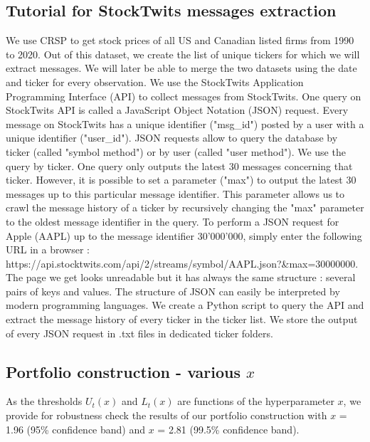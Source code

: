 \subsection{Tutorial for StockTwits messages extraction}
We use CRSP to get stock prices of all US and Canadian listed firms from 1990 to 2020. Out of this dataset, we create the list of unique tickers for which we will extract messages. We will later be able to merge the two datasets using the date and ticker for every observation. We use the StockTwits Application Programming Interface (API) to collect messages from StockTwits. One query on StockTwits API is called a JavaScript Object Notation (JSON) request. Every message on StockTwits has a unique identifier ("msg\_id") posted by a user with a unique identifier ("user\_id"). JSON requests allow to query the database by ticker (called "symbol method") or by user (called "user method"). We use the query by ticker. One query only outputs the latest 30 messages concerning that ticker. However, it is possible to set a parameter ("max") to output the latest 30 messages up to this particular message identifier. This parameter allows us to crawl the message history of a ticker by recursively changing the "max" parameter to the oldest message identifier in the query. To perform a JSON request for Apple (AAPL) up to the message identifier 30'000'000, simply enter the following URL in a browser : https://api.stocktwits.com/api/2/streams/symbol/AAPL.json?\&max=30000000. The page we get looks unreadable but it has always the same structure : several pairs of keys and values. The structure of JSON can easily be interpreted by modern programming languages. We create a Python script to query the API and extract the message history of every ticker in the ticker list. We store the output of every JSON request in .txt files in dedicated ticker folders.




\clearpage
\newpage

\subsection{Portfolio construction - various $x$}
As the thresholds $U_t(x)$ and $L_t(x)$ are functions of the hyperparameter $x$, we provide for robustness check the results of our portfolio construction with $x$ = 1.96  (95\% confidence band) and $x$ = 2.81 (99.5\% confidence band).
